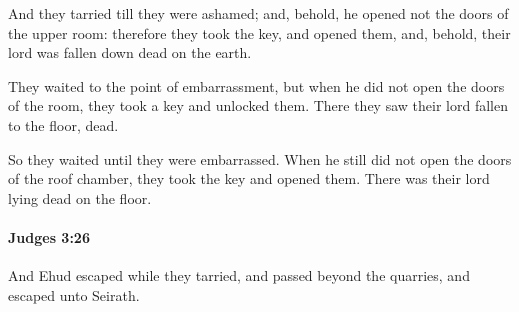 			\begin{versebox}
					\item[BHS] 
					\item[ASV] And they tarried till they were ashamed; and, behold, he opened not the doors of the upper room: therefore they took the key, and opened them, and, behold, their lord was fallen down dead on the earth.
					\item[NIV] They waited to the point of embarrassment, but when he did not open the doors of the room, they took a key and unlocked them. There they saw their lord fallen to the floor, dead.
					\item[NRSV] So they waited until they were embarrassed. When he still did not open the doors of the roof chamber, they took the key and opened them. There was their lord lying dead on the floor.
			\end{versebox}

		\paragraph{Judges 3:26} %
			\label{JUDGES-3-26}

			And Ehud escaped while they tarried, and passed beyond the quarries, and escaped unto Seirath.

